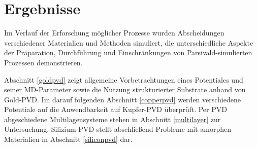 \cleardoublepage
\chapter{Ergebnisse}

Im Verlauf der Erforschung möglicher Prozesse wurden Abscheidungen verschiedener Materialien und Methoden simuliert, die unterschiedliche Aspekte der Präparation, Durchführung und Einschränkungen von Parsivald-simulierten Prozessen demonstrieren.

Abschnitt \ref{goldpvd} zeigt allgemeine Vorbetrachtungen eines Potentiales und seiner MD-Parameter sowie die Nutzung strukturierter Substrate anhand von Gold-PVD.
Im darauf folgenden Abschnitt \ref{copperpvd} werden verschiedene Potentiale auf die Anwendbarkeit auf Kupfer-PVD überprüft.
Per PVD abgeschiedene Multilagensysteme stehen in Abschnitt \ref{multilayer} zur Untersuchung.
Silizium-PVD stellt abschließend Probleme mit amorphen Materialien in Abschnitt \ref{siliconpvd} dar.


\clearpage

\clearpage

\clearpage

